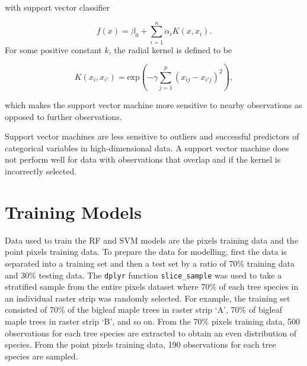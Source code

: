 \documentclass[12pt,twoside]{reedthesis}
\begin{document}
with support vector classifier

\[f(x) = \beta_0 + \sum_{i = 1}^n \alpha_i K(x, x_i).\]
For some positive constant \(k\), the radial kernel is defined to be

\[K(x_i, x_{i'}) = \mbox{exp}\left( -\gamma\sum_{j = 1}^p(x_{ij} - x_{i'j})^2 \right),\]

which makes the support vector machine more sensitive to nearby observations as opposed to further observations.

Support vector machines are less sensitive to outliers and successful predictors of categorical variables in high-dimensional data. A support vector machine does not perform well for data with observations that overlap and if the kernel is incorrectly selected.

\hypertarget{training-models}{%
\section{Training Models}\label{training-models}}

Data used to train the RF and SVM models are the pixels training data and the point pixels training data. To prepare the data for modelling, first the data is separated into a training set and then a test set by a ratio of 70\% training data and 30\% testing data. The \texttt{dplyr} function \texttt{slice\_sample} was used to take a stratified sample from the entire pixels dataset where 70\% of each tree species in an individual raster strip was randomly selected. For example, the training set consisted of 70\% of the bigleaf maple trees in raster strip `A', 70\% of bigleaf maple trees in raster strip `B', and so on. From the 70\% pixels training data, 500 observations for each tree species are extracted to obtain an even distribution of species. From the point pixels training data, 190 observations for each tree species are sampled.
\end{document}
